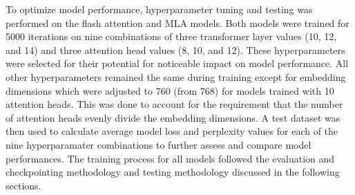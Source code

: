 To optimize model performance, hyperparameter tuning and testing was performed on the flash attention and MLA models. 
Both models were trained for 5000 iterations on nine combinations of three transformer layer values (10, 12, and 14) and three attention head values (8, 10, and 12). 
These hyperparameters were selected for their potential for noticeable impact on model performance.
All other hyperparameters remained the same during training except for embedding dimensions which were adjusted to 760 (from 768) for models trained with 10 attention heads. 
This was done to account for the requirement that the number of attention heads evenly divide the embedding dimensions. A test dataset was then used to calculate average model loss and perplexity values for each of the nine hyperparamater combinations to further assess and compare model performances.
The training process for all models followed the evaluation and checkpointing methodology and testing methodology discussed in the following sections. 


